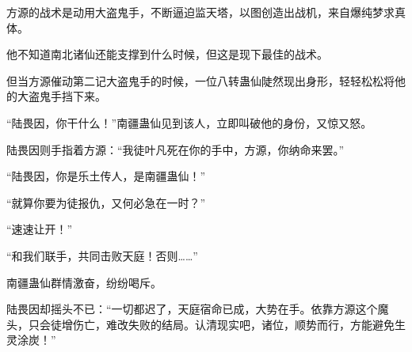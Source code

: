 \begin{this_body}
方源的战术是动用大盗鬼手，不断逼迫监天塔，以图创造出战机，来自爆纯梦求真体。

他不知道南北诸仙还能支撑到什么时候，但这是现下最佳的战术。

但当方源催动第二记大盗鬼手的时候，一位八转蛊仙陡然现出身形，轻轻松松将他的大盗鬼手挡下来。

“陆畏因，你干什么！”南疆蛊仙见到该人，立即叫破他的身份，又惊又怒。

陆畏因则手指着方源：“我徒叶凡死在你的手中，方源，你纳命来罢。”

“陆畏因，你是乐土传人，是南疆蛊仙！”

“就算你要为徒报仇，又何必急在一时？”

“速速让开！”

“和我们联手，共同击败天庭！否则……”

南疆蛊仙群情激奋，纷纷喝斥。

陆畏因却摇头不已：“一切都迟了，天庭宿命已成，大势在手。依靠方源这个魔头，只会徒增伤亡，难改失败的结局。认清现实吧，诸位，顺势而行，方能避免生灵涂炭！”

\end{this_body}

